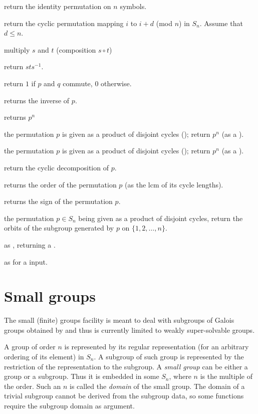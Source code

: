  return the identity permutation on $n$
symbols.

 return the cyclic permutation mapping
$i$ to $i+d$ (mod $n$) in $S_n$. Assume that $d \leq n$.

 multiply $s$ and $t$ (composition $s\circ t$)

 return $sts^{-1}$.

 return $1$ if $p$ and $q$ commute, 0
otherwise.

 returns the inverse of $p$.

 returns $p^n$

 the permutation $p$ is given as
a product of disjoint cycles (); return $p^n$ (as a ).

 the permutation $p$ is given as
a product of disjoint cycles (); return $p^n$ (as a ).

 return the cyclic decomposition of $p$.

 returns the order of the permutation $p$
(as the lcm of its cycle lengths).

 returns the sign of the permutation $p$.

 the permutation $p\in S_n$ being
given as a product of disjoint cycles, return the orbits of the subgroup
generated by $p$ on $\{1,2,\ldots,n\}$.

 as , returning a
.

 as  for a  input.

\section{Small groups}

The small (finite) groups facility is meant to deal with subgroups of Galois
groups obtained by  and thus is currently limited to weakly
super-solvable groups.

A group  of order $n$ is represented by its regular representation
(for an arbitrary ordering of its element) in $S_n$.  A subgroup of such group
is represented by the restriction of the representation to the subgroup.
A \emph{small group} can be either a group or a subgroup. Thus it is embedded
in some $S_n$, where $n$ is the multiple of the order. Such an $n$ is called
the \emph{domain} of the small group. The domain of a trivial subgroup cannot
be derived from the subgroup data, so some functions require the subgroup
domain as argument.

